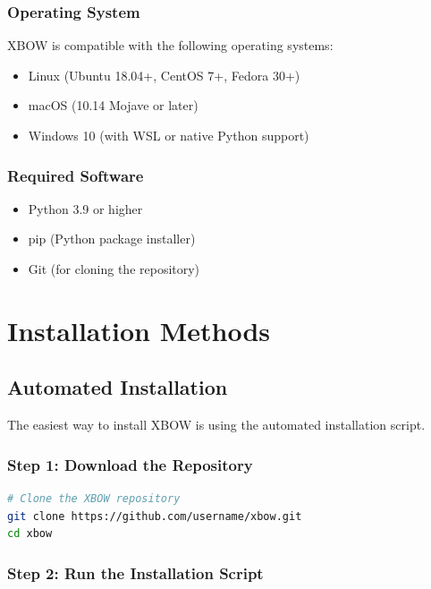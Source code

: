 \documentclass[12pt,a4paper]{report}
\begin{document}
\subsubsection{Operating System}

XBOW is compatible with the following operating systems:

\begin{itemize}
    \item Linux (Ubuntu 18.04+, CentOS 7+, Fedora 30+)
    \item macOS (10.14 Mojave or later)
    \item Windows 10 (with WSL or native Python support)
\end{itemize}

\subsubsection{Required Software}

\begin{itemize}
    \item Python 3.9 or higher
    \item pip (Python package installer)
    \item Git (for cloning the repository)
\end{itemize}

\section{Installation Methods}

\subsection{Automated Installation}

The easiest way to install XBOW is using the automated installation script.

\subsubsection{Step 1: Download the Repository}

\begin{lstlisting}[language=bash]
# Clone the XBOW repository
git clone https://github.com/username/xbow.git
cd xbow
\end{lstlisting}

\subsubsection{Step 2: Run the Installation Script}
\end{document}
